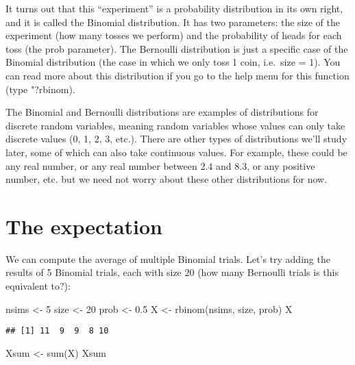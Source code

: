 \documentclass[
]{book}
\newenvironment{Shaded}{\begin{snugshade}}{\end{snugshade}}
\newcommand{\DecValTok}[1]{\textcolor[rgb]{0.00,0.00,0.81}{#1}}
\newcommand{\FloatTok}[1]{\textcolor[rgb]{0.00,0.00,0.81}{#1}}
\newcommand{\FunctionTok}[1]{\textcolor[rgb]{0.00,0.00,0.00}{#1}}
\newcommand{\NormalTok}[1]{#1}
\newcommand{\OtherTok}[1]{\textcolor[rgb]{0.56,0.35,0.01}{#1}}
\begin{document}
It turns out that this ``experiment'' is a probability distribution in its own right, and it is called the Binomial distribution. It has two parameters: the size of the experiment (how many tosses we perform) and the probability of heads for each toss (the prob parameter). The Bernoulli distribution is just a specific case of the Binomial distribution (the case in which we only toss 1 coin, i.e.~size = 1). You can read more about this distribution if you go to the help menu for this function (type "?rbinom).

The Binomial and Bernoulli distributions are examples of distributions for discrete random variables, meaning random variables whose values can only take discrete values (0, 1, 2, 3, etc.). There are other types of distributions we'll study later, some of which can also take continuous values. For example, these could be any real number, or any real number between 2.4 and 8.3, or any positive number, etc. but we need not worry about these other distributions for now.

\hypertarget{the-expectation}{%
\section{The expectation}\label{the-expectation}}

We can compute the average of multiple Binomial trials. Let's try adding the results of 5 Binomial trials, each with size 20 (how many Bernoulli trials is this equivalent to?):

\begin{Shaded}
\begin{Highlighting}[]
\NormalTok{nsims }\OtherTok{\textless{}{-}} \DecValTok{5}
\NormalTok{size }\OtherTok{\textless{}{-}} \DecValTok{20}
\NormalTok{prob }\OtherTok{\textless{}{-}} \FloatTok{0.5}
\NormalTok{X }\OtherTok{\textless{}{-}} \FunctionTok{rbinom}\NormalTok{(nsims, size, prob)}
\NormalTok{X}
\end{Highlighting}
\end{Shaded}

\begin{verbatim}
## [1] 11  9  9  8 10
\end{verbatim}

\begin{Shaded}
\begin{Highlighting}[]
\NormalTok{Xsum }\OtherTok{\textless{}{-}} \FunctionTok{sum}\NormalTok{(X)}
\NormalTok{Xsum}
\end{Highlighting}
\end{Shaded}
\end{document}
